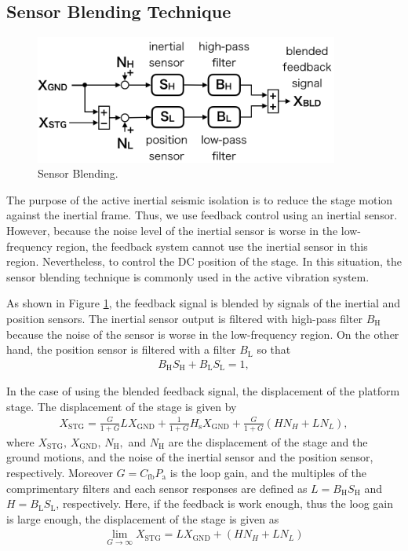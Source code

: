 \subsection{Sensor Blending Technique}
\begin{figure}[h]
  \begin{center}   
    \includegraphics[width=10cm]{./img_chap5/img507.png}
    \caption{Sensor Blending.} \label{img:img507}
  \end{center}
\end{figure}

The purpose of the active inertial seismic isolation is to reduce the stage motion against the inertial frame. Thus, we use feedback control using an inertial sensor. However, because the noise level of the inertial sensor is worse in the low-frequency region, the feedback system cannot use the inertial sensor in this region. Nevertheless, to control the DC position of the stage. In this situation, the sensor blending technique is commonly used in the active vibration system.

As shown in Figure \ref{img:img507}, the feedback signal is blended by signals of the inertial and position sensors. The inertial sensor output is filtered with high-pass filter $B_{\mathrm{H}}$ because the noise of the sensor is worse in the low-frequency region. On the other hand, the position sensor is filtered with a filter $B_{\mathrm{L}}$ so that
\begin{eqnarray}
  B_{\mathrm{H}}S_{\mathrm{H}} + B_{\mathrm{L}}S_{\mathrm{L}} = 1,   \label{eq:eq506}
\end{eqnarray}


In the case of using the blended feedback signal, the displacement of the platform stage. The displacement of the stage is given by
\begin{eqnarray}
  X_{\mathrm{STG}} = \frac{G}{1+G}LX_{\mathrm{GND}} + \frac{1}{1+G}H_{\mathrm{s}}X_{\mathrm{GND}} + \frac{G}{1+G}\left(HN_{H}+LN_{L}\right),   \label{eq:eq510}
\end{eqnarray}
where $X_{\mathrm{STG}},\,X_{\mathrm{GND}},\,N_{\mathrm{H}},$ and $N_{\mathrm{H}}$ are the displacement of the stage and the ground motions, and the noise of the inertial sensor and the position sensor, respectively. Moreover $G=C_{\mathrm{fb}}P_{\mathrm{a}}$ is the loop gain, and the multiples of the comprimentary filters and each sensor responses are defined as $L=B_{\mathrm{H}}S_{\mathrm{H}}$ and $H=B_{\mathrm{L}}S_{\mathrm{L}}$, respectively. Here, if the feedback is work enough, thus the loog gain is large enough, the displacement of the stage is given as
\begin{eqnarray}
  \lim_{G\to\infty} X_{\mathrm{STG}} = LX_{\mathrm{GND}} + \left(HN_{H}+LN_{L}\right) \label{eq:eq510_a}
\end{eqnarray}

